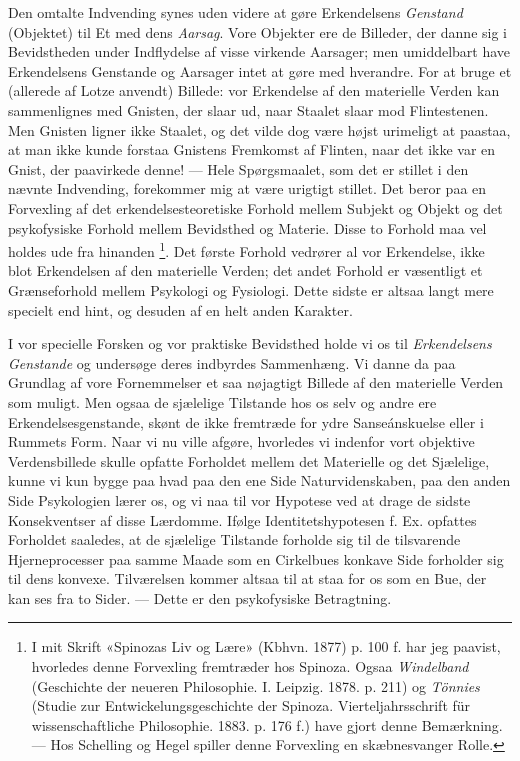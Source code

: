 \documentclass[12pt,a4paper,openany]{book}
\newcommand{\opage}[1]{\marginnote{\footnotesize\textit{[#1]}}}
\begin{document}
Den omtalte Indvending synes uden videre at gøre Erkendelsens \emph{Genstand}
(Objektet) til Et med dens \emph{Aarsag}. Vore Objekter ere de Billeder, der
danne sig i Bevidstheden under Indflydelse af visse virkende Aarsager; men
umiddelbart have Erkendelsens Genstande og Aarsager intet at gøre med
hverandre. For at bruge et (allerede af Lotze anvendt) Billede: vor Erkendelse
af den materielle Verden kan sammenlignes med Gnisten, der slaar ud, naar
Staalet slaar mod Flintestenen. Men Gnisten ligner ikke Staalet, og det vilde
dog være højst urimeligt at paastaa, at man ikke kunde forstaa Gnistens
Fremkomst af Flinten, naar det ikke var en Gnist, der paavirkede denne! ---
Hele Spørgsmaalet, som det er stillet i den nævnte Indvending, forekommer mig
at være urigtigt stillet. Det beror paa en Forvexling af det
erkendelsesteoretiske Forhold mellem Subjekt og Objekt og det psykofysiske
Forhold mellem Bevidsthed og Materie. Disse to Forhold maa vel holdes ude fra
hinanden%
\footnote[1]{I mit Skrift «Spinozas Liv og Lære» (Kbhvn. 1877) p. 100 f. har
jeg paavist, hvorledes denne Forvexling fremtræder hos Spinoza. Ogsaa
\emph{Windelband} (Geschichte der neueren Philosophie. I. Leipzig. 1878. p.
211) og \emph{Tönnies} (Studie zur Entwickelungsgeschichte der Spinoza.
Vierteljahrsschrift für wissenschaftliche Philosophie. 1883. p. 176 f.) have
gjort denne Bemærkning. --- Hos Schelling og Hegel spiller denne Forvexling en
skæbnesvanger Rolle.}. Det første Forhold vedrører al vor Erkendelse, ikke blot
Erkendelsen af den materielle Verden; det andet Forhold er væsentligt et
Grænseforhold mellem Psykologi og Fysiologi. Dette sidste er altsaa langt mere
specielt end hint, og desuden af en helt anden Karakter.

I vor specielle Forsken og vor praktiske Bevidsthed holde vi os til
\emph{Erkendelsens Genstande} og undersøge deres indbyrdes Sammenhæng. Vi danne
da paa Grundlag af vore Fornemmelser et saa nøjagtigt Billede af den materielle
Verden som muligt. Men ogsaa de sjælelige Tilstande hos os selv og andre ere
Erkendelsesgenstande, skønt de ikke fremtræde for ydre Sanseánskuelse eller i
Rummets Form. Naar vi nu ville afgøre, hvorledes vi indenfor vort objektive
Verdensbillede skulle opfatte Forholdet mellem det Materielle og det Sjælelige,
kunne vi kun bygge paa hvad paa den ene Side Naturvidenskaben, paa den anden
Side Psykologien lærer os, og vi naa til vor Hypotese ved at drage
\setcounter{footnote}{0}%
\opage{89}de sidste Konsekventser af disse Lærdomme. Ifølge Identitetshypotesen
f. Ex. opfattes Forholdet saaledes, at de sjælelige Tilstande forholde sig til
de tilsvarende Hjerneprocesser paa samme Maade som en Cirkelbues konkave Side
forholder sig til dens konvexe. Tilværelsen kommer altsaa til at staa for os
som en Bue, der kan ses fra to Sider. --- Dette er den psykofysiske Betragtning.
\end{document}

